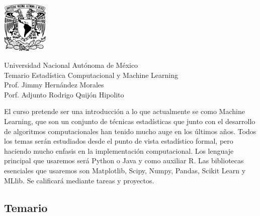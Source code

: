 \documentclass[11pt]{report}
\begin{document}
\pagestyle{fancy}

\begin{minipage}{3.8cm}
\includegraphics[width=2.2cm]{unam.pdf} 
\end{minipage}
\begin{minipage}{0.42\linewidth}
\begin{center}
{\large Universidad Nacional Autónoma de México\\Temario Estadística Computacional y Machine Learning\\
Prof. Jimmy Hernández Morales\\
Porf. Adjunto  Rodrigo Quijón Hipolito}
\end{center}
\end{minipage}
\vspace{1cm}

El curso pretende ser una introducción a lo que actualmente se como Machine Learning, que son un conjunto de técnicas estadísticas que junto con el desarrollo de algoritmos computacionales han tenido mucho auge en los últimos años.  Todos los temas serán estudiados desde el punto de vista estadístico formal, pero haciendo mucho enfasis en la implementación computacional. 
Los lenguaje principal que usaremos será Python o Java y como auxiliar R. Las bibliotecas esenciales que usaremos son Matplotlib, Scipy, Numpy, Pandas, Scikit Learn y MLlib. Se calificará mediante tareas y proyectos.

\subsection*{Temario}
\end{document}
